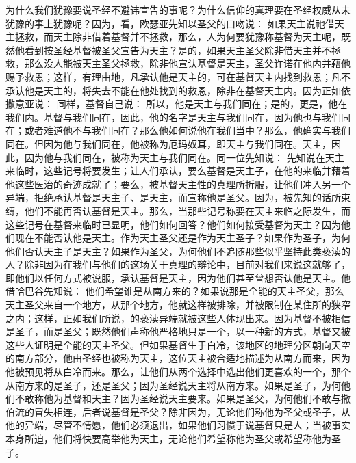 为什么我们犹豫要说圣经不避讳宣告的事呢？为什么信仰的真理要在圣经权威从未犹豫的事上犹豫呢？因为，看，欧瑟亚先知以圣父的口吻说： 如果天主说祂借天主拯救，而天主除非借着基督并不拯救，那么，人为何要犹豫称基督为天主呢，既然他看到按圣经基督被圣父宣告为天主？是的，如果天主圣父除非借天主并不拯救，那么没人能被天主圣父拯救，除非他宣认基督是天主，圣父许诺在他内并藉他赐予救恩；这样，有理由地，凡承认他是天主的，可在基督天主内找到救恩；凡不承认他是天主的，将失去不能在他处找到的救恩，除非在基督天主内。因为正如依撒意亚说： 同样，基督自己说： 所以，他是天主与我们同在；是的，更是，他在我们内。基督与我们同在，因此，他的名字是天主与我们同在，因为他也与我们同在；或者难道他不与我们同在？那么他如何说他在我们当中？那么，他确实与我们同在。但因为他与我们同在，他被称为厄玛奴耳，即天主与我们同在。天主，因此，因为他与我们同在，被称为天主与我们同在。同一位先知说： 先知说在天主来临时，这些记号将要发生；让人们承认，要么基督是天主子，在他的来临并藉着他这些医治的奇迹成就了；要么，被基督天主性的真理所折服，让他们冲入另一个异端，拒绝承认基督是天主子、是天主，而宣称他是圣父。因为，被先知的话所束缚，他们不能再否认基督是天主。那么，当那些记号称要在天主来临之际发生，而这些记号在基督来临时已显明，他们如何回答？他们如何接受基督为天主？因为他们现在不能否认他是天主。作为天主圣父还是作为天主圣子？如果作为圣子，为何他们否认天主子是天主？如果作为圣父，为何他们不追随那些似乎坚持此类亵渎的人？除非因为在我们与他们的这场关于真理的辩论中，目前对我们来说这就够了，即他们以任何方式被说服，承认基督是天主，因为他们甚至曾想否认他是天主。他借哈巴谷先知说： 他们希望谁是从南方来的？如果说那是全能的天主圣父，那么天主圣父来自一个地方，从那个地方，他就这样被排除，并被限制在某住所的狭窄之内；这样，正如我们所说，的亵渎异端就被这些人体现出来。因为基督不被相信是圣子，而是圣父；既然他们声称他严格地只是一个，以一种新的方式，基督又被这些人证明是全能的天主圣父。但如果基督生于白冷，该地区的地理分区朝向天空的南方部分，他由圣经也被称为天主，这位天主被合适地描述为从南方而来，因为他被预见将从白冷而来。那么，让他们从两个选择中选出他们更喜欢的一个，那个从南方来的是圣子，还是圣父；因为圣经说天主将从南方来。如果是圣子，为何他们不敢称他为基督和天主？因为圣经说天主要来。如果是圣父，为何他们不敢与撒伯流的冒失相连，后者说基督是圣父？除非因为，无论他们称他为圣父或圣子，从他的异端，尽管不情愿，他们必须退出，如果他们习惯于说基督只是人；当被事实本身所迫，他们将快要高举他为天主，无论他们希望称他为圣父或希望称他为圣子。\par

